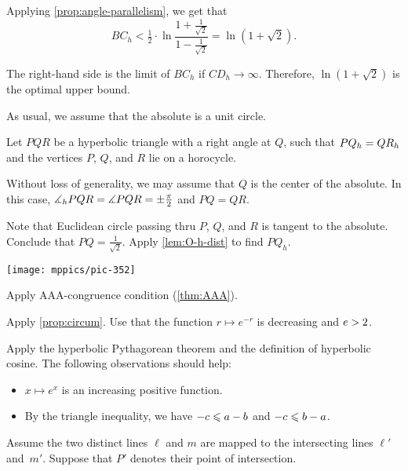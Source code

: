 \begin{multicols}{2}
Applying \ref{prop:angle-parallelism},
we get that
$$BC_h<\tfrac12\cdot\ln\frac{1+\frac1{\sqrt{2}}}{1-\frac1{\sqrt{2}}}=\ln\left(1+\sqrt{2}\right).$$

The right-hand side is the limit of $BC_h$ if $CD_h\to\infty$.
Therefore, $\ln\left(1+\sqrt{2}\right)$ is the optimal upper bound.

As usual, we assume that the absolute is a unit circle.

Let $PQR$ be a hyperbolic triangle
with a right angle at $Q$, such that $PQ_h\z=QR_h$
and the vertices $P$, $Q$, and $R$ 
lie on a horocycle.

Without loss of generality, we may assume that $Q$ is the center of the absolute.
In this case, $\measuredangle_hPQR\z=\measuredangle PQR\z=\pm\tfrac\pi2$ and $PQ=QR$.

Note that Euclidean circle passing thru $P$, $Q$, and $R$ is tangent to the absolute.
Conclude that $PQ=\tfrac1{\sqrt2}$. 
Apply \ref{lem:O-h-dist} to find $PQ_h$.

\begin{Figure}
\vskip-0mm
\centering
\texttt{[image: mppics/pic-352]}
\end{Figure}


Apply AAA-congruence condition (\ref{thm:AAA}).

Apply \ref{prop:circum}.
Use that the function $r\mapsto e^{-r}$ is decreasing and $e\z>2$.

Apply the hyperbolic Pythagorean theorem and the definition of hyperbolic cosine.
The following observations should help:
\begin{itemize}
 \item $x\mapsto e^x$ is an increasing positive function.
 \item By the triangle inequality,  we have $-c\z\le a-b$ and $-c\z\le b-a$.
\end{itemize}

\setcounter{eqtn}{0}

Assume the two distinct lines $\ell$ and $m$ 
are mapped to the intersecting lines $\ell'$ and~$m'$.
Suppose that $P'$ denotes their point of intersection.


\end{multicols}
